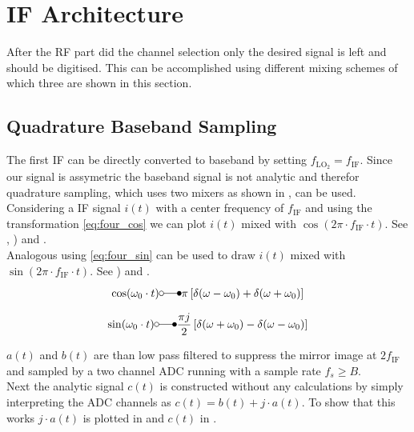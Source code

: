 \section{IF Architecture}
After the \gls{RF} part did the channel selection only the desired signal
is left and should be digitised.
This can be accomplished using different
mixing schemes of which three are shown in this section. \\

\subsection{Quadrature Baseband Sampling}
\label{sec:rx_adc_1}
The first \gls{IF} can be directly converted to baseband by
setting $f_{\text{LO}_2} = f_{\text{IF}}$.
Since our signal is assymetric the baseband signal is not analytic
and therefor quadrature sampling, which uses two mixers as shown in
, can be used. \\

Considering a \gls{IF} signal $i(t)$ with a center frequency of $f_{\text{IF}}$
and using the transformation \eqref{eq:four_cos}
we can plot $i(t)$ mixed with $\cos(2\pi \cdot f_{\text{IF}} \cdot t)$.
See , )
and . \\

Analogous using \eqref{eq:four_sin} can be used to draw $i(t)$ mixed with
$\sin(2\pi \cdot f_{\text{IF}} \cdot t)$.
See ) and . \\

\begin{align}
  \label{eq:four_cos}
  \cos(\omega_0 \cdot t) \laplace \pi
  \left[\delta(\omega - \omega_0) + \delta(\omega + \omega_0) \right]
\end{align}

\begin{align}
  \label{eq:four_sin}
  \sin(\omega_0 \cdot t) \laplace \frac{\pi j}{2}
  \left[\delta(\omega + \omega_0) - \delta(\omega - \omega_0) \right]
\end{align}

$a(t)$ and $b(t)$ are than low pass filtered to suppress the mirror image
at $2 f_{\text{IF}}$ and sampled by a two channel \gls{ADC} running with a
sample rate $f_s \geq B$. \\

Next the analytic signal $c(t)$ is constructed without any calculations
by simply interpreting the \gls{ADC} channels as
$c(t) = b(t) + j \cdot a(t)$. To show that this works $j \cdot a(t)$
is plotted in  and
$c(t)$ in .


